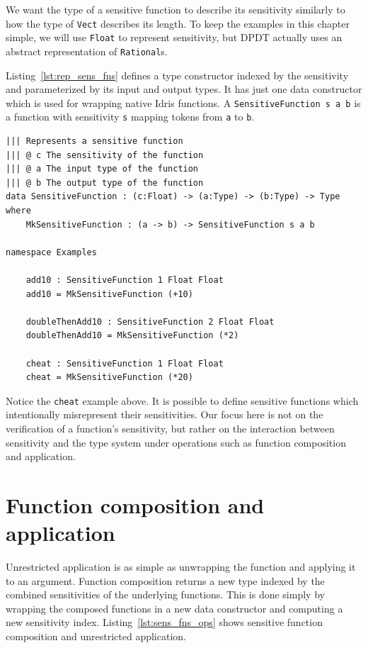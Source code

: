 \documentclass[12pt]{report}
\begin{document}
We want the type of a sensitive function to describe its sensitivity similarly to how the type of \texttt{Vect} describes its length.
To keep the examples in this chapter simple, we will use \texttt{Float} to represent sensitivity, but DPDT actually uses an abstract representation of \texttt{Rational}s.

Listing~\ref{lst:rep_sens_fns} defines a type constructor indexed by the sensitivity and parameterized by its input and output types.
It has just one data constructor which is used for wrapping native Idris functions.
A \texttt{SensitiveFunction s a b} is a function with sensitivity \texttt{s} mapping tokens from \texttt{a} to \texttt{b}.

\begin{lstlisting}[float,caption={Representing sensitive functions},label={lst:rep_sens_fns}]
||| Represents a sensitive function
||| @ c The sensitivity of the function
||| @ a The input type of the function
||| @ b The output type of the function
data SensitiveFunction : (c:Float) -> (a:Type) -> (b:Type) -> Type where
    MkSensitiveFunction : (a -> b) -> SensitiveFunction s a b

namespace Examples

    add10 : SensitiveFunction 1 Float Float
    add10 = MkSensitiveFunction (+10)

    doubleThenAdd10 : SensitiveFunction 2 Float Float
    doubleThenAdd10 = MkSensitiveFunction (*2)

    cheat : SensitiveFunction 1 Float Float
    cheat = MkSensitiveFunction (*20)
\end{lstlisting}

Notice the \texttt{cheat} example above.
It is possible to define sensitive functions which intentionally misrepresent their sensitivities.
Our focus here is not on the verification of a function's sensitivity, but rather on the interaction between sensitivity and the type system under operations such as function composition and application.

\section{Function composition and application}

Unrestricted application is as simple as unwrapping the function and applying it to an argument.
Function composition returns a new type indexed by the combined sensitivities of the underlying functions.
This is done simply by wrapping the composed functions in a new data constructor and computing a new sensitivity index.
Listing~\ref{lst:sens_fns_ops} shows sensitive function composition and unrestricted application.
\end{document}
